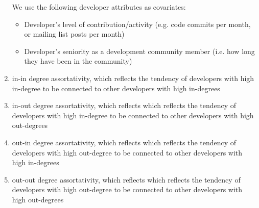 \documentclass[12pt]{report}
\begin{document}
\begin{enumerate}
We use the following developer attributes as covariates:
\begin{itemize}
\item Developer's level of contribution/activity (e.g. code commits per month, or mailing list posts per month)
\item Developer's seniority as a development community member (i.e. how long they have been in the community)
\end{itemize}

\item{in-in degree assortativity, which reflects the tendency of developers with high in-degree to be connected to other developers with high in-degrees}
\item{in-out degree assortativity, which reflects which reflects the tendency of developers with high in-degree to be connected to other developers with high out-degrees}
\item{out-in degree assortativity, which reflects which reflects the tendency of developers with high out-degree to be connected to other developers with high in-degrees}
\item{out-out degree assortativity, which reflects which reflects the tendency of developers with high out-degree to be connected to other developers with high out-degrees}
\end{enumerate}
%
\end{document}
